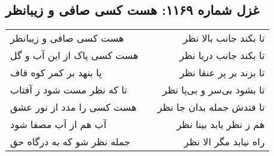 \begin{center}
\section*{غزل شماره ۱۱۶۹: هست کسی صافی و زیبانظر}
\label{sec:1169}
\begin{longtable}{l p{0.5cm} r}
هست کسی صافی و زیبانظر
&&
تا بکند جانب بالا نظر
\\
هست کسی پاک از این آب و گل
&&
تا بکند جانب دریا نظر
\\
پا بنهد بر کمر کوه قاف
&&
تا بزند بر پر عنقا نظر
\\
تا که نظر مست شود ز آفتاب
&&
تا بشود بی‌سر و بی‌پا نظر
\\
هست کسی را مدد از نور عشق
&&
تا فتدش جمله بدان جا نظر
\\
آب هم از آب مصفا شود
&&
هم ز نظر یابد بینا نظر
\\
جمله نظر شو که به درگاه حق
&&
راه نیابد مگر الا نظر
\\
\end{longtable}
\end{center}
